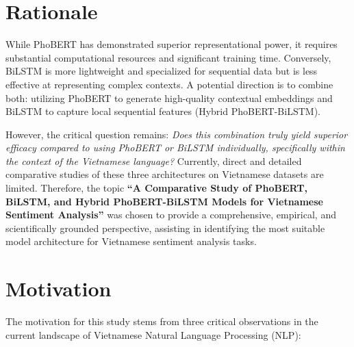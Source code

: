 \documentclass[12pt]{report} %
\begin{document}
\section{Rationale}

While PhoBERT has demonstrated superior representational power, it requires substantial computational resources and significant training time. Conversely, BiLSTM is more lightweight and specialized for sequential data but is less effective at representing complex contexts. A potential direction is to combine both: utilizing PhoBERT to generate high-quality contextual embeddings and BiLSTM to capture local sequential features (Hybrid PhoBERT-BiLSTM).

However, the critical question remains: \textit{Does this combination truly yield superior efficacy compared to using PhoBERT or BiLSTM individually, specifically within the context of the Vietnamese language?} Currently, direct and detailed comparative studies of these three architectures on Vietnamese datasets are limited. Therefore, the topic \textbf{``A Comparative Study of PhoBERT, BiLSTM, and Hybrid PhoBERT-BiLSTM Models for Vietnamese Sentiment Analysis''} was chosen to provide a comprehensive, empirical, and scientifically grounded perspective, assisting in identifying the most suitable model architecture for Vietnamese sentiment analysis tasks.

\section{Motivation}

The motivation for this study stems from three critical observations in the current landscape of Vietnamese Natural Language Processing (NLP):
\end{document}
